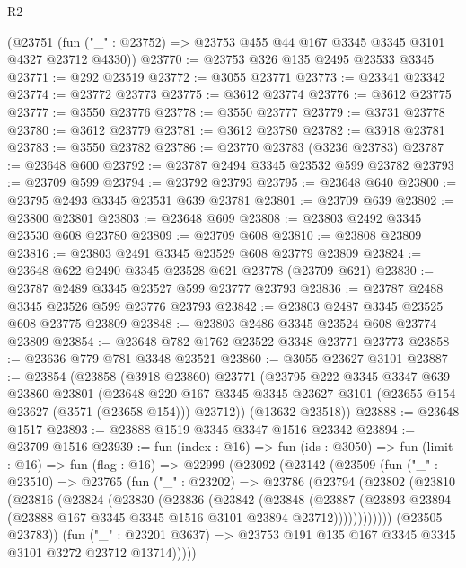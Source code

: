 \begin{lexlean}{R2}
\begin{coremodule}
    (@23751 (fun ("_" : @23752) => @23753 @455 @44 @167 @3345 @3345 @3101 @4327 @23712 @4330))
@23770 := @23753 @326 @135 @2495 @23533 @3345
@23771 := @292 @23519
@23772 := @3055 @23771
@23773 := @23341 @23342
@23774 := @23772 @23773
@23775 := @3612 @23774
@23776 := @3612 @23775
@23777 := @3550 @23776
@23778 := @3550 @23777
@23779 := @3731 @23778
@23780 := @3612 @23779
@23781 := @3612 @23780
@23782 := @3918 @23781
@23783 := @3550 @23782
@23786 := @23770 @23783 (@3236 @23783)
@23787 := @23648 @600
@23792 := @23787 @2494 @3345 @23532 @599 @23782
@23793 := @23709 @599
@23794 := @23792 @23793
@23795 := @23648 @640
@23800 := @23795 @2493 @3345 @23531 @639 @23781
@23801 := @23709 @639
@23802 := @23800 @23801
@23803 := @23648 @609
@23808 := @23803 @2492 @3345 @23530 @608 @23780
@23809 := @23709 @608
@23810 := @23808 @23809
@23816 := @23803 @2491 @3345 @23529 @608 @23779 @23809
@23824 := @23648 @622 @2490 @3345 @23528 @621 @23778 (@23709 @621)
@23830 := @23787 @2489 @3345 @23527 @599 @23777 @23793
@23836 := @23787 @2488 @3345 @23526 @599 @23776 @23793
@23842 := @23803 @2487 @3345 @23525 @608 @23775 @23809
@23848 := @23803 @2486 @3345 @23524 @608 @23774 @23809
@23854 := @23648 @782 @1762 @23522 @3348 @23771 @23773
@23858 := @23636 @779 @781 @3348 @23521
@23860 := @3055 @23627 @3101
@23887 := @23854
    (@23858
      (@3918 @23860)
      @23771
      (@23795
        @222
        @3345
        @3347
        @639
        @23860
        @23801
        (@23648
          @220
          @167
          @3345
          @3345
          @23627
          @3101
          (@23655 @154 @23627 (@3571 (@23658 @154)))
          @23712))
      (@13632 @23518))
@23888 := @23648 @1517
@23893 := @23888 @1519 @3345 @3347 @1516 @23342
@23894 := @23709 @1516
@23939 := fun (index : @16) =>
  fun (ids : @3050) =>
  fun (limit : @16) =>
  fun (flag : @16) =>
  @22999
    (@23092
      (@23142
        (@23509
          (fun ("_" : @23510) =>
          @23765
            (fun ("_" : @23202) =>
            @23786
              (@23794
                (@23802
                  (@23810
                    (@23816
                      (@23824
                        (@23830
                          (@23836
                            (@23842
                              (@23848
                                (@23887
                                  (@23893
                                    @23894
                                    (@23888 @167 @3345 @3345 @1516 @3101 @23894 @23712))))))))))))
              (@23505 @23783))
            (fun ("_" : @23201 @3637) =>
            @23753 @191 @135 @167 @3345 @3345 @3101 @3272 @23712 @13714)))))

\end{coremodule}
\end{lexlean}
